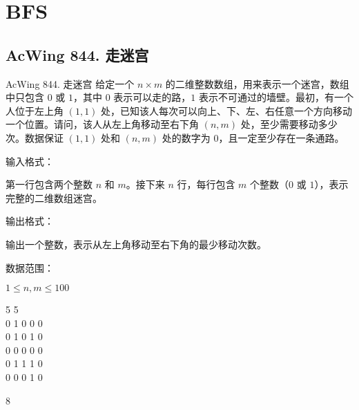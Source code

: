 \section{BFS}

\subsection{AcWing 844. 走迷宫}
\begin{titledbox}{AcWing 844. 走迷宫}
    给定一个 $n \times m$ 的二维整数数组，用来表示一个迷宫，数组中只包含 $0$ 或 $1$，其中 $0$ 表示可以走的路，$1$ 表示不可通过的墙壁。最初，有一个人位于左上角 $(1, 1)$ 处，已知该人每次可以向上、下、左、右任意一个方向移动一个位置。请问，该人从左上角移动至右下角 $(n, m)$ 处，至少需要移动多少次。数据保证 $(1, 1)$ 处和 $(n, m)$ 处的数字为 $0$，且一定至少存在一条通路。

    输入格式：

    第一行包含两个整数 $n$ 和 $m$。接下来 $n$ 行，每行包含 $m$ 个整数（$0$ 或 $1$），表示完整的二维数组迷宫。

    输出格式：

    输出一个整数，表示从左上角移动至右下角的最少移动次数。

    数据范围：

    $1 \le n, m \le 100$

    \begin{inputblock}
        5 5 \\
        0 1 0 0 0 \\
        0 1 0 1 0 \\
        0 0 0 0 0 \\
        0 1 1 1 0 \\
        0 0 0 1 0
    \end{inputblock}
    \begin{outputblock}
        8
    \end{outputblock}
\end{titledbox}

